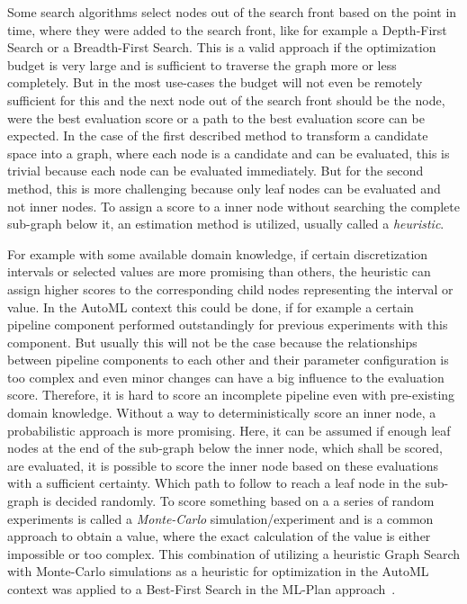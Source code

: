 Some search algorithms select nodes out of the search front  based on the point in time, where they were added to the search front, like for example a Depth-First Search or a Breadth-First Search.
This is a valid approach if the optimization budget is very large and is sufficient to traverse the graph more or less completely.
But in the most use-cases the budget will not even be remotely sufficient for this and the next node out of the search front should be the node, were the best evaluation score or a path to the best evaluation score can be expected.\newline
In the case of the first described method to transform a candidate space into a graph, where each node is a candidate and can be evaluated, this is trivial because each node can be evaluated immediately.
But for the second method, this is more challenging because only leaf nodes can be evaluated and not inner nodes.
To assign a score to a inner node without searching the complete sub-graph below it, an estimation method is utilized, usually called a \textit{heuristic}.

For example with some available domain knowledge, if certain discretization intervals or selected values are more promising than others, the heuristic can assign higher scores to the corresponding child nodes representing the interval or value.
In the AutoML context this could be done, if for example a certain pipeline component performed outstandingly for previous experiments with this component.
But usually this will not be the case because the relationships between pipeline components to each other and their parameter configuration is too complex and even minor changes can have a big influence to the evaluation score.
Therefore, it is hard to score an incomplete pipeline even with pre-existing domain knowledge.\newline
Without a way to deterministically score an inner node, a probabilistic approach is more promising.
Here, it can be assumed if enough leaf nodes at the end of the sub-graph below the inner node, which shall be scored, are evaluated, it is possible to score the inner node based on these evaluations with a sufficient certainty.
Which path to follow to reach a leaf node in the sub-graph is decided randomly.
To score something based on a a series of random experiments is called a \textit{Monte-Carlo} simulation/experiment and is a common approach to obtain a value, where the exact calculation of the value is either impossible or too complex.
This combination of utilizing a heuristic Graph Search with Monte-Carlo simulations as a heuristic for optimization in the AutoML context was applied to a Best-First Search in the ML-Plan approach~\cite{Mohr-ML-Plan}.

